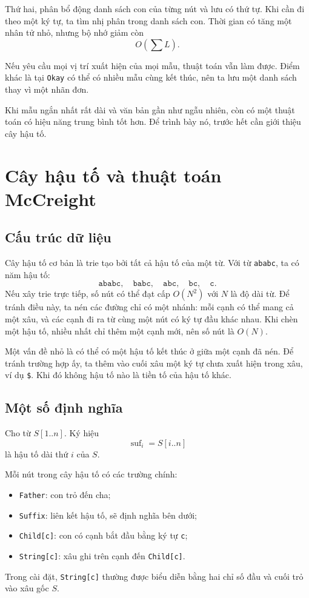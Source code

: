 \documentclass[11pt]{article}
\begin{document}
Thứ hai, phân bổ động danh sách con của từng nút và lưu có thứ tự. Khi cần đi
theo một ký tự, ta tìm nhị phân trong danh sách con. Thời gian có tăng một
nhân tử nhỏ, nhưng bộ nhớ giảm còn
\[
  O\left(\sum L\right).
\]

Nếu yêu cầu mọi vị trí xuất hiện của mọi mẫu, thuật toán vẫn làm được. Điểm
khác là tại \texttt{Okay} có thể có nhiều mẫu cùng kết thúc, nên ta lưu một
danh sách thay vì một nhãn đơn.

Khi mẫu ngắn nhất rất dài và văn bản gần như ngẫu nhiên, còn có một thuật toán
có hiệu năng trung bình tốt hơn. Để trình bày nó, trước hết cần giới thiệu cây
hậu tố.

\section{Cây hậu tố và thuật toán McCreight}

\subsection{Cấu trúc dữ liệu}

Cây hậu tố cơ bản là trie tạo bởi tất cả hậu tố của một từ. Với từ
\texttt{ababc}, ta có năm hậu tố:
\[
  \texttt{ababc},\quad \texttt{babc},\quad
  \texttt{abc},\quad \texttt{bc},\quad \texttt{c}.
\]
Nếu xây trie trực tiếp, số nút có thể đạt cấp $O(N^2)$ với $N$ là độ dài từ.
Để tránh điều này, ta nén các đường chỉ có một nhánh: mỗi cạnh có thể mang cả
một xâu, và các cạnh đi ra từ cùng một nút có ký tự đầu khác nhau. Khi chèn
một hậu tố, nhiều nhất chỉ thêm một cạnh mới, nên số nút là $O(N)$.

Một vấn đề nhỏ là có thể có một hậu tố kết thúc ở giữa một cạnh đã nén. Để
tránh trường hợp ấy, ta thêm vào cuối xâu một ký tự chưa xuất hiện trong xâu,
ví dụ \texttt{\$}. Khi đó không hậu tố nào là tiền tố của hậu tố khác.

\subsection{Một số định nghĩa}

Cho từ $S[1..n]$. Ký hiệu
\[
  \operatorname{suf}_i=S[i..n]
\]
là hậu tố dài thứ $i$ của $S$.

Mỗi nút trong cây hậu tố có các trường chính:
\begin{itemize}
  \item \texttt{Father}: con trỏ đến cha;
  \item \texttt{Suffix}: liên kết hậu tố, sẽ định nghĩa bên dưới;
  \item \texttt{Child[c]}: con có cạnh bắt đầu bằng ký tự \texttt{c};
  \item \texttt{String[c]}: xâu ghi trên cạnh đến \texttt{Child[c]}.
\end{itemize}
Trong cài đặt, \texttt{String[c]} thường được biểu diễn bằng hai chỉ số đầu và
cuối trỏ vào xâu gốc $S$.
\end{document}
